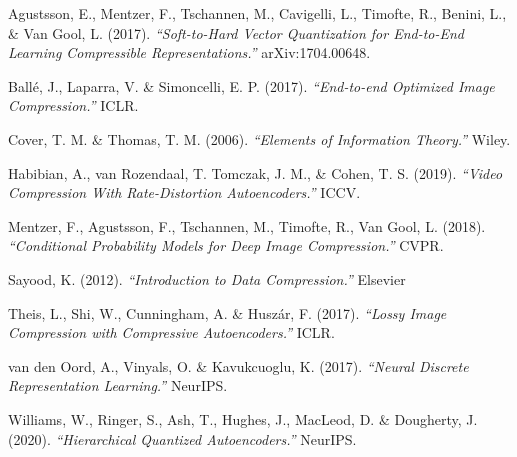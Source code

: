 \documentclass[smaller]{beamer}
\begin{document}












\begin{frame}[t]


\footnotesize

\vspace{0.5em}
Agustsson, E., Mentzer, F., Tschannen, M., Cavigelli, L., Timofte, R., Benini, L., \& Van Gool, L. (2017). \emph{``Soft-to-Hard Vector Quantization for End-to-End Learning Compressible Representations.''}  arXiv:1704.00648.

\vspace{0.5em}
Ballé, J., Laparra, V. \& Simoncelli, E. P. (2017). \emph{``End-to-end Optimized Image Compression.''} ICLR.

\vspace{0.5em}
Cover, T. M.  \& Thomas, T. M. (2006). \emph{``Elements of Information Theory.''} Wiley.

\vspace{0.5em}
Habibian, A., van Rozendaal, T. Tomczak, J. M., \& Cohen, T. S. (2019). \emph{``Video Compression With Rate-Distortion Autoencoders.''} ICCV.

\vspace{0.5em}
Mentzer, F., Agustsson, F., Tschannen, M., Timofte, R., Van Gool, L. (2018). \emph{``Conditional Probability Models for Deep Image Compression.''} CVPR.

\vspace{0.5em}
Sayood, K. (2012). \emph{``Introduction to Data Compression.''} Elsevier

\vspace{0.5em}
Theis, L., Shi, W., Cunningham, A. \& Huszár, F. (2017). \emph{``Lossy Image Compression with Compressive Autoencoders.''} ICLR.

\vspace{0.5em}
van den Oord, A., Vinyals, O. \& Kavukcuoglu, K. (2017). \emph{``Neural Discrete Representation Learning.''} NeurIPS.

\vspace{0.5em}
Williams, W., Ringer, S., Ash, T., Hughes, J., MacLeod, D. \& Dougherty, J. (2020). \emph{``Hierarchical Quantized Autoencoders.''} NeurIPS.

\end{frame}
\end{document}
